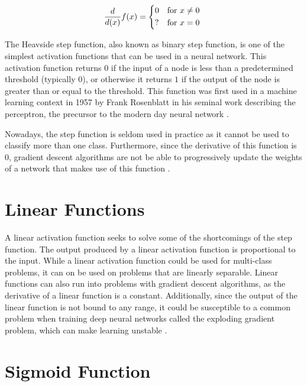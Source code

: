 \begin{equation}\label{stepfunctionderivative}
    \frac{d}{d(x)}f(x) =
      \begin{dcases*}
                                       0 & \text{for \(x \neq 0\)} \\
                                       ? & \text{for \(x = 0\)} \\
      \end{dcases*}
\end{equation}

The Heavside step function, also known as binary step function, is one of the simplest activation functions that can be used in a neural network. This activation function returns $0$ if the input of a node is less than a predetermined threshold (typically $0$), or otherwise it returns $1$ if the output of the node is greater than or equal to the threshold. This function was first used in a machine learning context in 1957 by Frank Rosenblatt in his seminal work describing the perceptron, the precursor to the modern day neural network \cite{rosenblatt1957perceptron}. 

Nowadays, the step function is seldom used in practice as it cannot be used to classify more than one class. Furthermore, since the derivative of this function is $0$, gradient descent algorithms are not be able to progressively update the weights of a network that makes use of this function \cite{Snyman2005}.

\section{Linear Functions}\label{sec:linear-function}

A linear activation function seeks to solve some of the shortcomings of the step function. The output produced by a linear activation function is proportional to the input. While a linear activation function could be used for multi-class problems, it can on be used on problems that are linearly separable. Linear functions can also run into problems with gradient descent algorithms, as the derivative of a linear function is a constant. Additionally, since the output of the linear function is not bound to any range, it could be susceptible to a common problem when training deep neural networks called the exploding gradient problem, which can make learning unstable \cite{goodfellow2016deeplearning}.

\section{Sigmoid Function}\label{sec:sigmoid}

